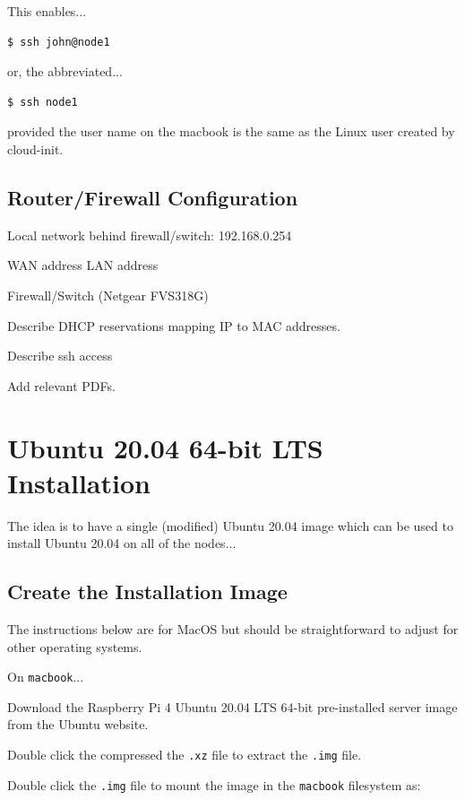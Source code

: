 \documentclass{report}
\begin{document}
This enables...

\lstset{style=type}
\begin{lstlisting}[]
$ ssh john@node1
\end{lstlisting}

or, the abbreviated...

\lstset{style=type}
\begin{lstlisting}[]
$ ssh node1
\end{lstlisting}

provided the user name on the macbook is the same as the Linux user created by cloud-init.



\subsection{Router/Firewall Configuration}

Local network behind firewall/switch: 192.168.0.254

WAN address
LAN address

Firewall/Switch (Netgear FVS318G)

Describe DHCP reservations mapping IP to MAC addresses.

Describe ssh access

Add relevant PDFs.


%
%
\clearpage\section{Ubuntu 20.04 64-bit LTS Installation}

The idea is to have a single (modified) Ubuntu 20.04 image which can be used to install Ubuntu 20.04 on all of the nodes...


%
%
\subsection{Create the Installation Image}

The instructions below are for MacOS but should be straightforward to adjust for other operating systems.

On \verb|macbook|...

Download the Raspberry Pi 4 Ubuntu 20.04 LTS 64-bit pre-installed server image from the Ubuntu website.

Double click the compressed the \verb|.xz| file to extract the \verb|.img| file. 

Double click the \verb|.img| file to mount the image in the \verb|macbook| filesystem as:
\end{document}
